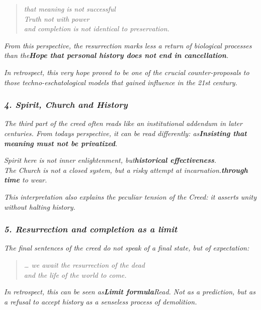 \documentclass[
]{article}
\begin{document}
\begin{quote}
\emph{that meaning is not successful\\
Truth not with power\\
and completion is not identical to preservation.}
\end{quote}

\emph{From this perspective, the resurrection marks less a return of biological processes than the\textbf{Hope that personal history does not end in cancellation}.}

\emph{In retrospect, this very hope proved to be one of the crucial counter-proposals to those techno-eschatological models that gained influence in the 21st century.}

\subsubsection{\texorpdfstring{\emph{\textbf{4. Spirit, Church and History}}}{4. Spirit, Church and History}}\label{spirit-church-and-history}

\emph{The third part of the creed often reads like an institutional addendum in later centuries. From today\textquotesingle s perspective, it can be read differently: as\textbf{Insisting that meaning must not be privatized}.}

\emph{Spirit here is not inner enlightenment, but\textbf{historical effectiveness}.\\
The Church is not a closed system, but a risky attempt at incarnation.\textbf{through time} to wear.}

\emph{This interpretation also explains the peculiar tension of the Creed: it asserts unity without halting history.}

\subsubsection{\texorpdfstring{\emph{\textbf{5. Resurrection and completion as a limit}}}{5. Resurrection and completion as a limit}}\label{resurrection-and-completion-as-a-limit}

\emph{The final sentences of the creed do not speak of a final state, but of expectation:}

\begin{quote}
\emph{\ldots{} we await the resurrection of the dead\\
and the life of the world to come.}
\end{quote}

\emph{In retrospect, this can be seen as\textbf{Limit formula}Read. Not as a prediction, but as a refusal to accept history as a senseless process of demolition.}
\end{document}
